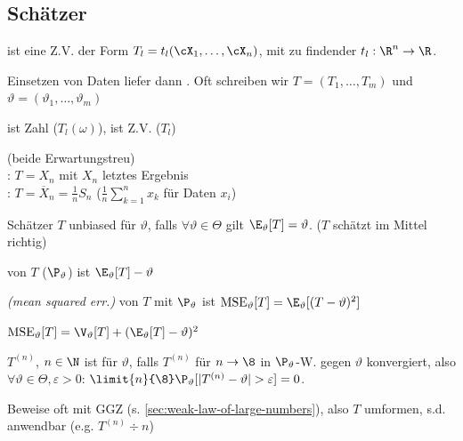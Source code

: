 \subsection{Schätzer}
\label{sec:estimators}
\shortdefinition[Schätzer] ist eine Z.V. der Form $T_l = t_l(\cX_1, \ldots, \cX_n)$, mit zu findender  $t_l : \R^n \rightarrow \R$.

Einsetzen von Daten liefer dann . Oft schreiben wir $T = (T_1, \ldots, T_m)$ und $\vartheta = (\vartheta_1, \ldots, \vartheta_m)$

\shortremark {} ist Zahl ($T_l(\omega)$),  ist Z.V. ($T_l$)

\shortexample {} (beide Erwartungstreu)\\
: $T = X_n$ mit $X_n$ letztes Ergebnis\\
: $T = \overline{X}_n = \frac{1}{n} S_n$ ($\frac{1}{n} \sum_{k = 1}^{n} x_k$ für Daten $x_i$)

\shortdefinition[Erwartungstreue] Schätzer $T$ unbiased für $\vartheta$, falls $\forall \vartheta \in \Theta$ gilt $\E_\vartheta [T] = \vartheta$.
($T$ schätzt im Mittel richtig)

\shortdefinition[Bias]  von $T$ ($\P_\vartheta$) ist $\E_\vartheta[T] - \vartheta$

\shortdefinition[MSE]  \textit{(mean squared err.)} von $T$ mit $\P_\vartheta$ ist
$\text{MSE}_\vartheta[T] = \E_\vartheta[(T - \vartheta)^2]$

\shortremark $\text{MSE}_\vartheta[T] = \V_\vartheta[T] + (\E_\vartheta[T] - \vartheta)^2$

\shortdefinition {} $T^{(n)}$, $n \in \N$ ist  für $\vartheta$,
falls $T^{(n)}$ für $n \rightarrow \8$ in $\P_\vartheta$-W. gegen $\vartheta$ konvergiert, also $\forall \vartheta \in \Theta, \varepsilon > 0$:
$\limit{n}{\8} \P_\vartheta [|T^{(n)} - \vartheta| > \varepsilon] = 0$.

{\scriptsize Beweise oft mit GGZ (s. \ref{sec:weak-law-of-large-numbers}), also $T$ umformen, s.d. anwendbar (e.g. $T^{(n)} \div n$)}
